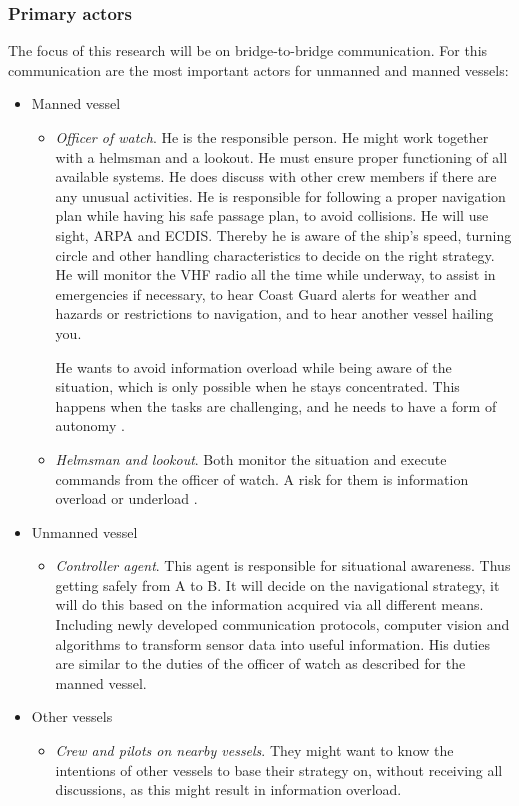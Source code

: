 \subsubsection{Primary actors}
The focus of this research will be on bridge-to-bridge communication. For this communication are the most important actors for unmanned and manned vessels:
\begin{itemize}
	\item Manned vessel
	\begin{itemize}
		\item \emph{Officer of watch}. He is the responsible person. He might work together with a helmsman and a lookout. He must ensure proper functioning of all available systems. He does discuss with other crew members if there are any unusual activities. He is responsible for following a proper navigation plan while having his safe passage plan, to avoid collisions. He will use sight, \acf{ARPA} and \acf{ECDIS}. Thereby he is aware of the ship's speed, turning circle and other handling characteristics to decide on the right strategy. He will monitor the \ac{VHF} radio all the time while underway, to assist in emergencies if necessary, to hear Coast Guard alerts for weather and hazards or restrictions to navigation, and to hear another vessel hailing you.
		
		He wants to avoid information overload while being aware of the situation, which is only possible when he stays concentrated. This happens when the tasks are challenging, and he needs to have a form of autonomy \cite{Porathe2014}.
		
		\item \emph{Helmsman and lookout}. Both monitor the situation and execute commands from the officer of watch. A risk for them is information overload or underload \cite{Neerincx2008}.
	\end{itemize}
	
	\item Unmanned vessel
	\begin{itemize}
		\item \emph{Controller agent}. This agent is responsible for situational awareness. Thus getting safely from A to B. It will decide on the navigational strategy, it will do this based on the information acquired via all different means. Including newly developed communication protocols, computer vision and algorithms to transform sensor data into useful information. His duties are similar to the duties of the officer of watch as described for the manned vessel.
	\end{itemize}
	
	\item Other vessels
	\begin{itemize}
		\item \emph{Crew and pilots on nearby vessels}. They might want to know the intentions of other vessels to base their strategy on, without receiving all discussions, as this might result in information overload.
	\end{itemize}
	
\end{itemize}

